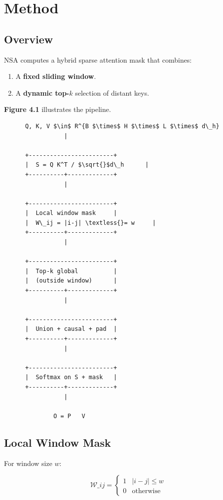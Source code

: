 
\section{Method}

\subsection{Overview}

NSA computes a hybrid sparse attention mask that combines:
\begin{enumerate}
\item A \textbf{fixed sliding window}.
\item A \textbf{dynamic top-$k$} selection of distant keys.

\end{enumerate}
\textbf{Figure 4.1} illustrates the pipeline.

\begin{lstlisting}
      Q, K, V $\in$ R^{B $\times$ H $\times$ L $\times$ d\_h}
                 |
                  
      +------------------------+
      |  S = Q K^T / $\sqrt{}$d\_h      |
      +----------+-------------+
                 |
                  
      +------------------------+
      |  Local window mask     |
      |  W\_ij = |i-j| \textless{}= w     |
      +----------+-------------+
                 |
                  
      +------------------------+
      |  Top-k global          |
      |  (outside window)      |
      +----------+-------------+
                 |
                  
      +------------------------+
      |  Union + causal + pad  |
      +----------+-------------+
                 |
                  
      +------------------------+
      |  Softmax on S + mask   |
      +----------+-------------+
                 |
                  
              O = P   V
\end{lstlisting}

\subsection{Local Window Mask}

For window size $w$:

\[
\mathcal{W}\_{ij} = \begin{cases} 1 & |i - j| \leq w \\ 0 & \text{otherwise} \end{cases}
\tag{4.1}
\]

